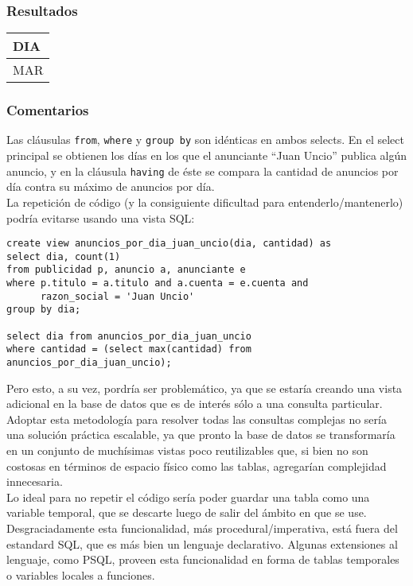 \subsubsection*{Resultados}
\begin{tabular}{|l|}
  \hline
    \bf{DIA} \\ 
  \hline
    MAR \\ 
  \hline
\end{tabular} 

\subsubsection*{Comentarios}

Las cl\'ausulas \lstinline|from|, \lstinline|where| y \lstinline|group by| son id\'enticas en ambos selects. En el select principal se obtienen los d\'ias en los que el anunciante ``Juan Uncio'' publica alg\'un anuncio, y en la cl\'ausula \lstinline|having| de \'este se compara la cantidad de anuncios por d\'ia contra su m\'aximo de anuncios por d\'ia. \\

La repetici\'on de c\'odigo (y la consiguiente dificultad para entenderlo/mantenerlo) podr\'ia evitarse usando una vista SQL:

\begin{lstlisting}
create view anuncios_por_dia_juan_uncio(dia, cantidad) as
select dia, count(1)
from publicidad p, anuncio a, anunciante e
where p.titulo = a.titulo and a.cuenta = e.cuenta and 
      razon_social = 'Juan Uncio'
group by dia;

select dia from anuncios_por_dia_juan_uncio
where cantidad = (select max(cantidad) from anuncios_por_dia_juan_uncio);
\end{lstlisting}

Pero esto, a su vez, pordr\'ia ser problem\'atico, ya que se estar\'ia creando una vista adicional en la base de datos que es de inter\'es s\'olo a una consulta particular. Adoptar esta metodolog\'ia para resolver todas las consultas complejas no ser\'ia una soluci\'on pr\'actica escalable, ya que pronto la base de datos se transformar\'ia en un conjunto de much\'isimas vistas poco reutilizables que, si bien no son costosas en t\'erminos de espacio f\'isico como las tablas, agregar\'ian complejidad innecesaria. \\

Lo ideal para no repetir el c\'odigo ser\'ia poder guardar una tabla como una variable temporal, que se descarte luego de salir del \'ambito en que se use. Desgraciadamente esta funcionalidad, m\'as procedural/imperativa, est\'a fuera del estandard SQL, que es m\'as bien un lenguaje declarativo. Algunas extensiones al lenguaje, como PSQL, proveen esta funcionalidad en forma de tablas temporales o variables locales a funciones.

